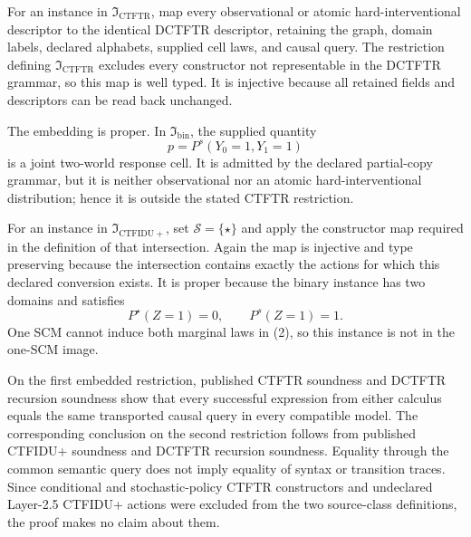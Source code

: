 For an instance in \(\mathfrak I_{\mathrm{CTFTR}}\), map every observational or atomic hard-interventional descriptor to the identical DCTFTR descriptor, retaining the graph, domain labels, declared alphabets, supplied cell laws, and causal query. The restriction defining \(\mathfrak I_{\mathrm{CTFTR}}\) excludes every constructor not representable in the DCTFTR grammar, so this map is well typed. It is injective because all retained fields and descriptors can be read back unchanged.

The embedding is proper. In \(\mathfrak I_{\mathrm{bin}}\), the supplied quantity
\[
p=P^s(Y_0=1,Y_1=1)\tag{1}
\]
is a joint two-world response cell. It is admitted by the declared partial-copy grammar, but it is neither observational nor an atomic hard-interventional distribution; hence it is outside the stated CTFTR restriction.

For an instance in \(\mathfrak I_{\mathrm{CTFIDU+}}\), set
\(\mathcal S=\{\star\}\) and apply the constructor map required in the definition of that intersection. Again the map is injective and type preserving because the intersection contains exactly the actions for which this declared conversion exists. It is proper because the binary instance has two domains and satisfies
\[
P^\star(Z=1)=0,\qquad P^s(Z=1)=1.\tag{2}
\]
One SCM cannot induce both marginal laws in (2), so this instance is not in the one-SCM image.

On the first embedded restriction, published CTFTR soundness and DCTFTR recursion soundness show that every successful expression from either calculus equals the same transported causal query in every compatible model. The corresponding conclusion on the second restriction follows from published CTFIDU+ soundness and DCTFTR recursion soundness. Equality through the common semantic query does not imply equality of syntax or transition traces. Since conditional and stochastic-policy CTFTR constructors and undeclared Layer-2.5 CTFIDU+ actions were excluded from the two source-class definitions, the proof makes no claim about them.